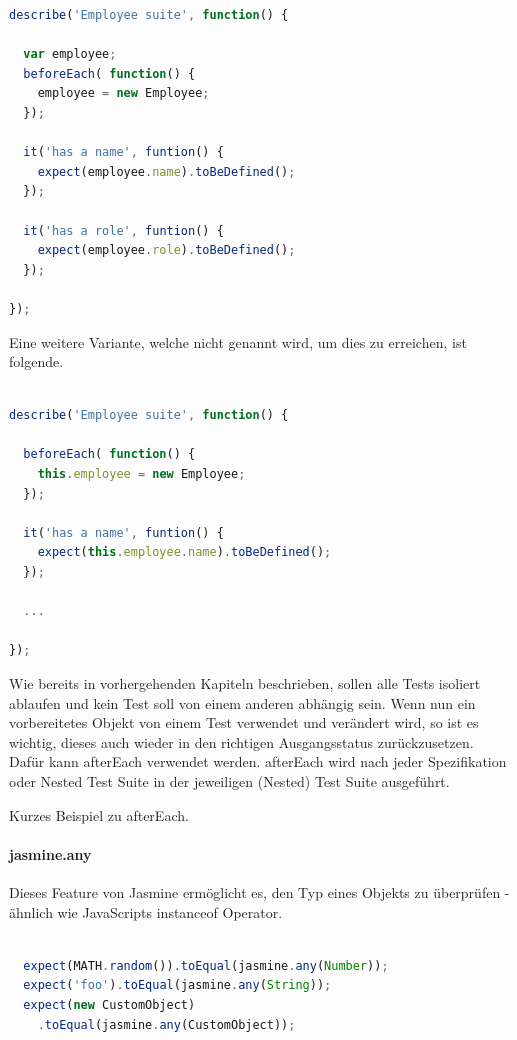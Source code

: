 {\begin{lstlisting}[language=JavaScript]
describe('Employee suite', function() {

  var employee;
  beforeEach( function() {
    employee = new Employee;
  });

  it('has a name', funtion() {
    expect(employee.name).toBeDefined();
  });

  it('has a role', funtion() {
    expect(employee.role).toBeDefined();
  });

});

\end{lstlisting}

Eine weitere Variante, welche nicht genannt wird, um dies zu erreichen, ist folgende.

\begin{lstlisting}[language=JavaScript]

describe('Employee suite', function() {

  beforeEach( function() {
    this.employee = new Employee;
  });

  it('has a name', funtion() {
    expect(this.employee.name).toBeDefined();
  });

  ...

});
\end{lstlisting}

Wie bereits in vorhergehenden Kapiteln beschrieben, sollen alle Tests isoliert ablaufen und kein Test soll von einem anderen abhängig sein. Wenn nun ein vorbereitetes Objekt von einem Test verwendet und verändert wird, so ist es wichtig, dieses auch wieder in den richtigen Ausgangsstatus zurückzusetzen. Dafür kann afterEach verwendet werden. afterEach wird nach jeder Spezifikation oder Nested Test Suite in der jeweiligen (Nested) Test Suite ausgeführt.

Kurzes Beispiel zu afterEach.

\paragraph{jasmine.any}
Dieses Feature von Jasmine ermöglicht es, den Typ eines Objekts zu überprüfen - ähnlich wie JavaScripts instanceof Operator.
\begin{lstlisting}[language=JavaScript]

  expect(MATH.random()).toEqual(jasmine.any(Number));
  expect('foo').toEqual(jasmine.any(String));
  expect(new CustomObject)
    .toEqual(jasmine.any(CustomObject));

\end{lstlisting}


}

